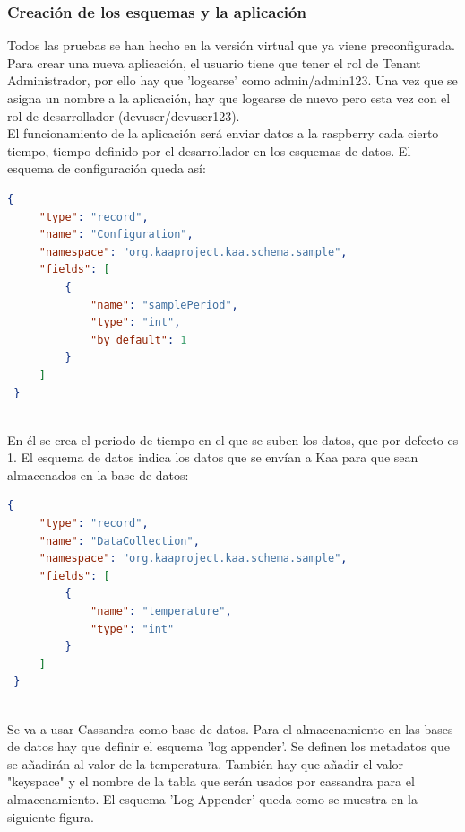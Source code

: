 \documentclass[12pt, twoside]{book}
\begin{document}
\subsubsection*{Creación de los esquemas y la aplicación}
Todos las pruebas se han hecho en la versión virtual que ya viene preconfigurada.\\ 
Para crear una nueva aplicación, el usuario tiene que tener el rol de Tenant Administrador, por ello hay que 'logearse' como admin/admin123. Una vez que se asigna un nombre a la aplicación, hay que logearse de nuevo pero esta vez con el rol de desarrollador (devuser/devuser123). \\
El funcionamiento de la aplicación será enviar datos a la raspberry cada cierto tiempo, tiempo definido por el desarrollador en los esquemas de datos. 
El esquema de configuración queda así:
\begin{lstlisting}[language=json]
{
     "type": "record",
     "name": "Configuration",
     "namespace": "org.kaaproject.kaa.schema.sample",
     "fields": [
         {
             "name": "samplePeriod",
             "type": "int",
             "by_default": 1
         }
     ]
 }
 
\end{lstlisting}
En él se crea el periodo de tiempo en el que se suben los datos, que por defecto es 1.
El esquema de datos indica los datos que se envían a Kaa para que sean almacenados en la base de datos:
\begin{lstlisting}[language=json]
{
     "type": "record",
     "name": "DataCollection",
     "namespace": "org.kaaproject.kaa.schema.sample",
     "fields": [
         {
             "name": "temperature",
             "type": "int"
         }
     ]
 }
 
\end{lstlisting}
Se va a usar Cassandra como base de datos. Para el almacenamiento en las bases de datos hay que definir el esquema 'log appender'. Se definen los metadatos que se añadirán al valor de la temperatura. También hay que añadir el valor "keyspace" y el nombre de la tabla que serán usados por cassandra para el almacenamiento. El esquema 'Log Appender' queda como se muestra en la siguiente figura.
\end{document}
